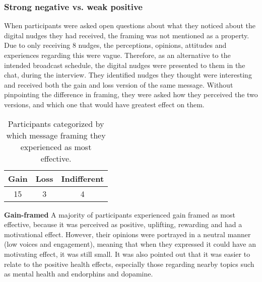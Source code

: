 \subsubsection{Strong negative vs. weak positive}
When participants were asked open questions about what they noticed about the digital nudges they had received, the framing was not mentioned as a property. Due to only receiving 8 nudges, the perceptions, opinions, attitudes and experiences regarding this were vague. Therefore, as an alternative to the intended broadcast schedule, the digital nudges were presented to them in the chat, during the interview. They identified nudges they thought were interesting and received both the gain and loss version of the same message. Without pinpointing the difference in framing, they were asked how they perceived the two versions, and which one that would have greatest effect on them.

\begin{table}[ht]
\begin{center}
\begin{tabular}{|c|c|c|}
\hline
\textbf{Gain} & \textbf{Loss} & \textbf{Indifferent} \\ \hline
15 & 3 & 4 \\ \hline
\end{tabular}
\caption{\label{tab:table-name} Participants categorized by which message framing they experienced as most effective.}
\end{center}
\end{table}

\bigbreak
\textbf{Gain-framed}
\bigbreak
A majority of participants experienced gain framed as most effective, because it was perceived as positive, uplifting, rewarding and had a motivational effect. However, their opinions were portrayed in a neutral manner (low voices and engagement), meaning that when they expressed it could have an motivating effect, it was still small. It was also pointed out that it was easier to relate to the positive health effects, especially those regarding nearby topics such as mental health and endorphins and dopamine. 

